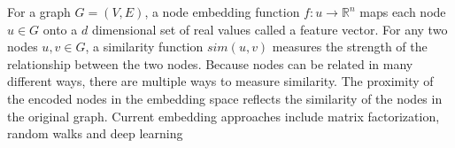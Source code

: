 

For a graph $G=(V,E)$, a node embedding function $f:u\rightarrow\mathbb{R}^n$ maps each node $u \in G$ onto a $d$ dimensional set of real values called a feature vector. For any two nodes $u,v\in G$, a similarity function $sim(u,v)$ measures the strength of the relationship between the two nodes. Because nodes can be related in many different ways, there are multiple ways to measure similarity. The proximity of the encoded nodes in the embedding space reflects the similarity of the nodes in the original graph. Current embedding approaches include matrix factorization\cite{belkin2002laplacian}\cite{ahmed2013distributed}, random walks\cite{perozzi2014deepwalk}\cite{grover2016node2vec} and deep learning\cite{wang2016structural}\cite{kipf2016semi}

\cite{Kutuzov_Dorgham_Oliynyk_Biemann_Panchenko_2019}

\cite{Hamilton_Ying_Leskovec}

